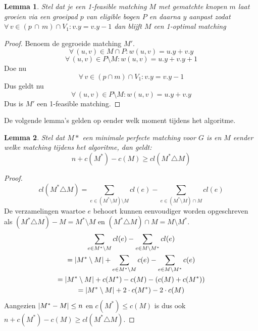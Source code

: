 \documentclass[conference]{IEEEtran}
\newtheorem{lemma}{Lemma}[section]
\theoremstyle{definition}
\DeclarePairedDelimiter{\card}{\vert}{\vert}  %
\let \oldforall \forall
\renewcommand{\forall}{\oldforall\,}
\begin{document}
\begin{lemma}
    Stel dat je een 1-feasible matching $M$ met gematchte knopen $m$ laat groeien via een groeipad $p$ van eligible bogen $P$ en daarna $y$ aanpast zodat $\forall v \in (p\, \cap\, m) \cap V_1: v.y = v.y - 1$ dan blijft $M$ een 1-optimal matching
\end{lemma}
\begin{proof}
    Benoem de gegroeide matching $M'$.
    $$\forall (u, v) \in M \cap P: w(u, v) = u.y + v.y$$
    $$\forall (u, v) \in P \setminus M: w(u, v) = u.y + v.y + 1$$
    Doe nu
    $$\forall v \in (p \cap m) \cap V_1: v.y = v.y - 1$$
    Dus geldt nu
    $$\forall (u, v) \in P\setminus M: w(u, v) = u.y + v.y$$
    Dus is $M'$ een 1-feasible matching.
\end{proof}

De volgende lemma's gelden op eender welk moment tijdens het algoritme.

\begin{lemma}
    Stel dat $M*$ een minimale perfecte matching voor $G$ is en $M$ eender welke matching tijdens het algoritme, dan geldt:
    \begin{equation*}
        n + c(M^*) - c(M) \geq cl(M^* \triangle M)
    \end{equation*}
\end{lemma}
\begin{proof}
    \begin{equation*}
        cl(M^* \triangle M) = \sum_{e \in (M^* \setminus M) \setminus M} cl(e) - \sum_{e \in (M^* \setminus M) \cap M} cl(e)
    \end{equation*}
    De verzamelingen waartoe $e$ behoort kunnen eenvoudiger worden opgeschreven als $(M^* \triangle M) - M = M^* \setminus M$ en $(M^* \triangle M) \cap M = M \setminus M^*$.
    \begin{gather*}
        \sum_{e \in M^* \setminus M} cl(e) - \sum_{e \in M \setminus M^*} cl(e) \\
        = \card{M^* \setminus M} + \sum_{e \in M^* \setminus M} c(e) - \sum_{e \in M \setminus M^*} c(e) \\
        = \card{M^* \setminus M} + c(M^*) - c(M) - (c(M) + c(M^*)) \\
        = \card{M^* \setminus M} + 2 \cdot c(M^*) - 2 \cdot c(M) \\
    \end{gather*}
    Aangezien $\card{M^* - M} \leq n$ en $c(M^*) \leq c(M)$ is dus ook $n + c(M^*) - c(M) \geq cl(M^* \triangle M)$.
\end{proof}
\end{document}
